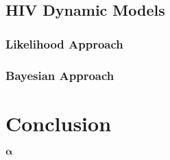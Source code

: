 \documentclass[12pt]{extarticle}
\begin{document}
\subsection{HIV Dynamic Models}
\label{sect:hiv}

\subsubsection{Likelihood Approach}
\label{sect:likelihoodapproach}

\subsubsection{Bayesian Approach}
\label{sect:bayesianapproach}

\section{Conclusion}
\label{sect:conclusion}

\cite{Putter02}
\cite{Huang0601}
\cite{Huang0602}
\cite{Guedj07}

\cite{Lu11}



$\boldsymbol{\alpha}$
\end{document}
